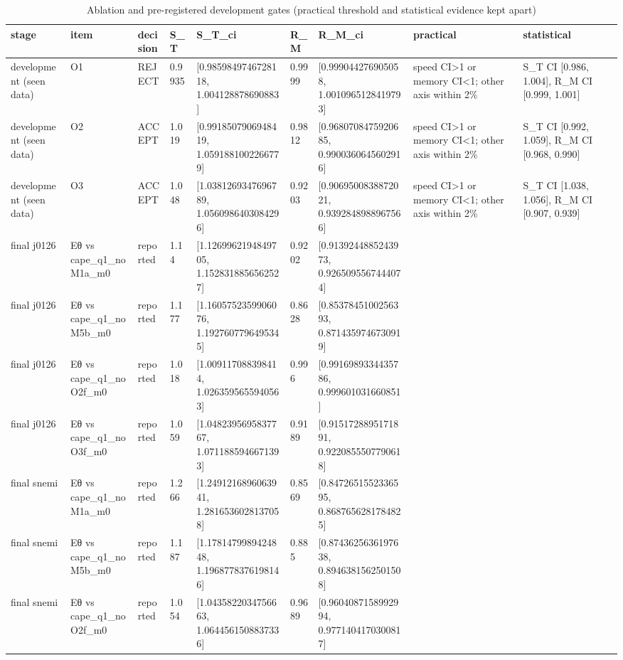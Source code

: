 \begin{table}[t]\centering\scriptsize
\caption{Ablation and pre-registered development gates (practical threshold and statistical evidence kept apart)}\label{tab:T05}
\begin{tabular}{lllllllll}
\hline
stage & item & decision & S\_T & S\_T\_ci & R\_M & R\_M\_ci & practical & statistical \\ \hline
development (seen data) & O1 & REJECT & 0.9935 & [0.9859849746728118, 1.004128878690883] & 0.9999 & [0.999044276905058, 1.0010965128419793] & speed CI>1 or memory CI<1; other axis within 2\% & S\_T CI [0.986, 1.004], R\_M CI [0.999, 1.001] \\
development (seen data) & O2 & ACCEPT & 1.019 & [0.9918507906948419, 1.0591881002266779] & 0.9812 & [0.9680708475920685, 0.9900360645602916] & speed CI>1 or memory CI<1; other axis within 2\% & S\_T CI [0.992, 1.059], R\_M CI [0.968, 0.990] \\
development (seen data) & O3 & ACCEPT & 1.048 & [1.0381269347696789, 1.0560986403084296] & 0.9203 & [0.9069500838872021, 0.9392848988967566] & speed CI>1 or memory CI<1; other axis within 2\% & S\_T CI [1.038, 1.056], R\_M CI [0.907, 0.939] \\
final j0126 & Eθ vs cape\_q1\_noM1a\_m0 & reported & 1.14 & [1.1269962194849705, 1.1528318856562527] & 0.9202 & [0.9139244885243973, 0.9265095567444074] &  &  \\
final j0126 & Eθ vs cape\_q1\_noM5b\_m0 & reported & 1.177 & [1.1605752359906076, 1.1927607796495345] & 0.8628 & [0.8537845100256393, 0.8714359746730919] &  &  \\
final j0126 & Eθ vs cape\_q1\_noO2f\_m0 & reported & 1.018 & [1.009117088398414, 1.0263595655940563] & 0.996 & [0.9916989334435786, 0.999601031660851] &  &  \\
final j0126 & Eθ vs cape\_q1\_noO3f\_m0 & reported & 1.059 & [1.0482395695837767, 1.0711885946671393] & 0.9189 & [0.9151728895171891, 0.9220855507790618] &  &  \\
final snemi & Eθ vs cape\_q1\_noM1a\_m0 & reported & 1.266 & [1.2491216896063941, 1.2816536028137058] & 0.8569 & [0.8472651552336595, 0.8687656281784825] &  &  \\
final snemi & Eθ vs cape\_q1\_noM5b\_m0 & reported & 1.187 & [1.1781479989424848, 1.1968778376198146] & 0.885 & [0.8743625636197638, 0.8946381562501508] &  &  \\
final snemi & Eθ vs cape\_q1\_noO2f\_m0 & reported & 1.054 & [1.0435822034756663, 1.0644561508837336] & 0.9689 & [0.9604087158992994, 0.9771404170300817] &  &  \\

\end{tabular}
\end{table}
